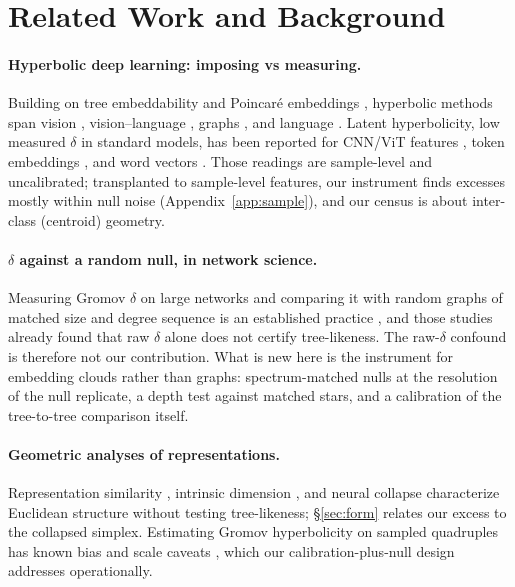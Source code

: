 \section{Related Work and Background}
\label{sec:related}

\paragraph{Hyperbolic deep learning: imposing vs measuring.} Building on tree embeddability \citep{sarkar2011low} and Poincar\'{e} embeddings \citep{nickel2017poincare, ganea2018hyperbolic}, hyperbolic methods span vision \citep{Khrulkov_2020_CVPR, ermolov2022hyperbolic, atigh2022hyperbolic, bdeir2024fully}, vision--language \citep{desai2023meru, pal2025compositional}, graphs \citep{chami2019hyperbolic}, and language \citep{chen2022fully, he2026helm, sinha2024learning}. Latent hyperbolicity, low measured $\delta$ in standard models, has been reported for CNN/ViT features \citep{Khrulkov_2020_CVPR, bdeir2024fully}, token embeddings \citep{yang2025hyperbolic}, and word vectors \citep{tifrea2019poincare}. Those readings are sample-level and uncalibrated; transplanted to sample-level features, our instrument finds excesses mostly within null noise (Appendix~\ref{app:sample}), and our census is about inter-class (centroid) geometry.

\paragraph{$\delta$ against a random null, in network science.} Measuring Gromov $\delta$ on large networks and comparing it with random graphs of matched size and degree sequence is an established practice \citep{narayan2011curvature, kennedy2013hyperbolicity, adcock2013treelike}, and those studies already found that raw $\delta$ alone does not certify tree-likeness. The raw-$\delta$ confound is therefore not our contribution. What is new here is the instrument for embedding clouds rather than graphs: spectrum-matched nulls at the resolution of the null replicate, a depth test against matched stars, and a calibration of the tree-to-tree comparison itself.

\paragraph{Geometric analyses of representations.} Representation similarity \citep{kornblith2019cka}, intrinsic dimension \citep{ansuini2019intrinsic, pope2021intrinsic}, and neural collapse \citep{papyan2020prevalence} characterize Euclidean structure without testing tree-likeness; \S\ref{sec:form} relates our excess to the collapsed simplex. Estimating Gromov hyperbolicity on sampled quadruples has known bias and scale caveats \citep{fournier2015computing}, which our calibration-plus-null design addresses operationally.

